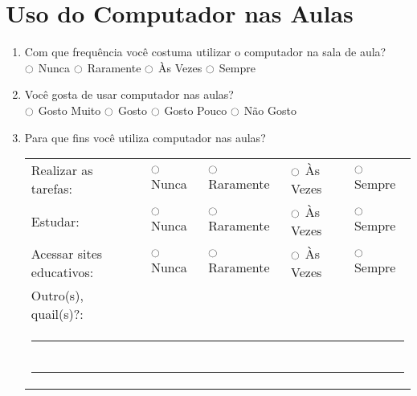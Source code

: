 \section{Uso do Computador nas Aulas}
\begin{enumerate}
\item Com que frequência você costuma utilizar o computador na sala de aula? \\
$\ocircle$ Nunca  $\ocircle$ Raramente  $\ocircle$ Às Vezes  $\ocircle$ Sempre \\

\item Você gosta de usar computador nas aulas? \\
$\ocircle$ Gosto Muito $\ocircle$ Gosto $\ocircle$ Gosto Pouco $\ocircle$ Não Gosto

\item Para que fins você utiliza computador nas aulas? \\
\begin{tabular}{lllll}
	Realizar as tarefas: & $\ocircle$ Nunca & $\ocircle$ Raramente & $\ocircle$ Às Vezes & $\ocircle$ Sempre \\
	Estudar: & $\ocircle$ Nunca & $\ocircle$ Raramente & $\ocircle$ Às Vezes & $\ocircle$ Sempre \\
	Acessar sites educativos: & $\ocircle$ Nunca & $\ocircle$ Raramente & $\ocircle$ Às Vezes & $\ocircle$ Sempre \\
	Outro(s), quail(s)?: \\
	\multicolumn{5}{l}{\noindent\rule{\textwidth}{0.4pt}} \\
	\multicolumn{5}{l}{\noindent\rule{\textwidth}{0.4pt}} \\
\end{tabular}

\end{enumerate}

